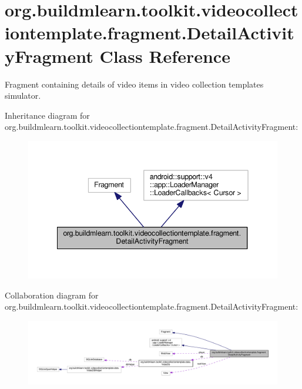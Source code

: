 \hypertarget{classorg_1_1buildmlearn_1_1toolkit_1_1videocollectiontemplate_1_1fragment_1_1DetailActivityFragment}{}\section{org.\+buildmlearn.\+toolkit.\+videocollectiontemplate.\+fragment.\+Detail\+Activity\+Fragment Class Reference}
\label{classorg_1_1buildmlearn_1_1toolkit_1_1videocollectiontemplate_1_1fragment_1_1DetailActivityFragment}


Fragment containing details of video items in video collection template\textquotesingle{}s simulator.  




Inheritance diagram for org.\+buildmlearn.\+toolkit.\+videocollectiontemplate.\+fragment.\+Detail\+Activity\+Fragment\+:
\nopagebreak
\begin{figure}[H]
\begin{center}
\leavevmode
\includegraphics[width=342pt]{classorg_1_1buildmlearn_1_1toolkit_1_1videocollectiontemplate_1_1fragment_1_1DetailActivityFragment__inherit__graph}
\end{center}
\end{figure}


Collaboration diagram for org.\+buildmlearn.\+toolkit.\+videocollectiontemplate.\+fragment.\+Detail\+Activity\+Fragment\+:
\nopagebreak
\begin{figure}[H]
\begin{center}
\leavevmode
\includegraphics[width=350pt]{classorg_1_1buildmlearn_1_1toolkit_1_1videocollectiontemplate_1_1fragment_1_1DetailActivityFragment__coll__graph}
\end{center}
\end{figure}
